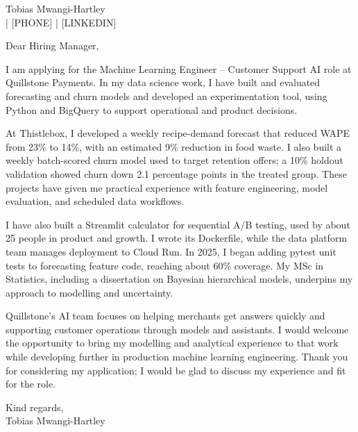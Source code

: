 \documentclass[11pt,a4paper]{article}
\begin{document}
Tobias Mwangi-Hartley\\
[EMAIL] | [PHONE] | [LINKEDIN]

Dear Hiring Manager,

I am applying for the Machine Learning Engineer – Customer Support AI role at Quillstone Payments. In my data science work, I have built and evaluated forecasting and churn models and developed an experimentation tool, using Python and BigQuery to support operational and product decisions.

At Thistlebox, I developed a weekly recipe-demand forecast that reduced WAPE from 23\% to 14\%, with an estimated 9\% reduction in food waste. I also built a weekly batch-scored churn model used to target retention offers; a 10\% holdout validation showed churn down 2.1 percentage points in the treated group. These projects have given me practical experience with feature engineering, model evaluation, and scheduled data workflows.

I have also built a Streamlit calculator for sequential A/B testing, used by about 25 people in product and growth. I wrote its Dockerfile, while the data platform team manages deployment to Cloud Run. In 2025, I began adding pytest unit tests to forecasting feature code, reaching about 60\% coverage. My MSc in Statistics, including a dissertation on Bayesian hierarchical models, underpins my approach to modelling and uncertainty.

Quillstone’s AI team focuses on helping merchants get answers quickly and supporting customer operations through models and assistants. I would welcome the opportunity to bring my modelling and analytical experience to that work while developing further in production machine learning engineering. Thank you for considering my application; I would be glad to discuss my experience and fit for the role.

Kind regards,\\
Tobias Mwangi-Hartley
\end{document}

